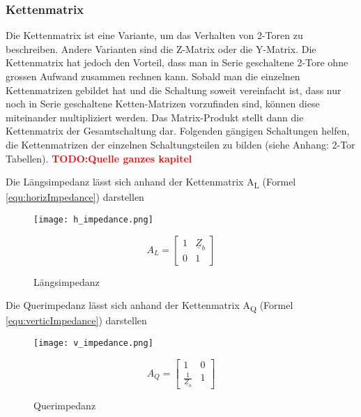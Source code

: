 \subsubsection{Kettenmatrix}\label{subsubsec:kettenmatrix}

Die Kettenmatrix ist eine Variante, um das Verhalten von 2-Toren zu beschreiben. Andere Varianten sind die Z-Matrix oder die Y-Matrix. Die Kettenmatrix hat jedoch den Vorteil, dass man in Serie geschaltene 2-Tore ohne grossen Aufwand zusammen rechnen kann. Sobald man die einzelnen Kettenmatrizen gebildet hat und die Schaltung soweit vereinfacht ist, dass nur noch in Serie geschaltene Ketten-Matrizen vorzufinden sind, können diese miteinander multipliziert werden. Das Matrix-Produkt stellt dann die Kettenmatrix der Gesamtschaltung dar. Folgenden gängigen Schaltungen helfen, die Kettenmatrizen der einzelnen Schaltungsteilen zu bilden (siehe Anhang: 2-Tor Tabellen). \textcolor{red}{\textbf{TODO:Quelle ganzes kapitel}}

Die Längsimpedanz lässt sich anhand der Kettenmatrix A\textsubscript{L} (Formel \ref{equ:horizImpedance}) darstellen
\begin{figure}[H]
	\begin{minipage}[h]{0.45\linewidth}
		\centering
		\texttt{[image: h\_impedance.png]}
		\caption{Längsimpedanz}
	\end{minipage}
	\begin{minipage}[h]{0.45\linewidth}
		\centering
		\begin{equation}\label{equ:horizImpedance}
			A_L = \left[\begin{matrix}
			1&\underline{Z}_b\\0&1
			\end{matrix}\right]
		\end{equation}
	\end{minipage}
\end{figure}

Die Querimpedanz lässt sich anhand der Kettenmatrix A\textsubscript{Q} (Formel \ref{equ:verticImpedance}) darstellen

\begin{figure}[H]
	\begin{minipage}[h]{0.45\linewidth}
		\centering
		\texttt{[image: v\_impedance.png]}
		\caption{Querimpedanz}
	\end{minipage}
	\begin{minipage}[h]{0.45\linewidth}
		\centering
		\begin{equation}\label{equ:verticImpedance}
			A_Q = \left[\begin{matrix}
			1&0\\\frac{1}{\underline{Z}_a}&1
			\end{matrix}\right]
		\end{equation}
	\end{minipage}
\end{figure}

